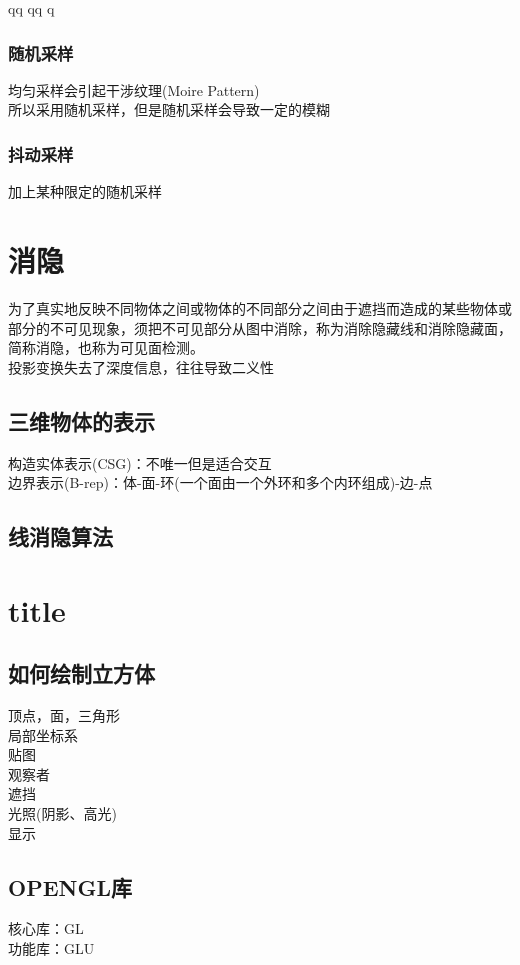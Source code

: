qq	qq	q                                                                                                                                                                                                                                                                                      \documentclass{article}
\begin{document}
\begin{CJK}{UTF8}{gbsn}
	\subsubsection{随机采样}
	均匀采样会引起干涉纹理(Moire Pattern)\\
	所以采用随机采样，但是随机采样会导致一定的模糊\\
	\subsubsection{抖动采样}
	加上某种限定的随机采样\\
	
	\section{消隐}
	为了真实地反映不同物体之间或物体的不同部分之间由于遮挡而造成的某些物体或部分的不可见现象，须把不可见部分从图中消除，称为消除隐藏线和消除隐藏面，简称消隐，也称为可见面检测。\\
	投影变换失去了深度信息，往往导致二义性
	
	
	\subsection{三维物体的表示}
	构造实体表示(CSG)：不唯一但是适合交互\\
	边界表示(B-rep)：体-面-环(一个面由一个外环和多个内环组成)-边-点\\
	
	\subsection{线消隐算法}
	
	
	\section{title}
	\subsection{如何绘制立方体}
	顶点，面，三角形\\
	局部坐标系\\
	贴图\\
	观察者\\
	遮挡\\
	光照(阴影、高光)\\
	显示\\
	\subsection{OPENGL库}
	核心库：GL\\
	功能库：GLU\\

\end{CJK}
\end{document}
